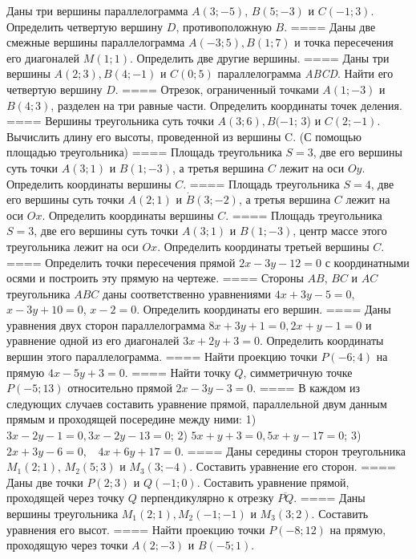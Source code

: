 Даны три вершины параллелограмма \(A(3; - 5)\), \(B(5; - 3)\) и \(C( - 1;3)\). Определить четвертую вершину \(D\), противоположную \(B\).
====
Даны две смежные вершины параллелограмма \(A( - 3;5),B(1;7)\) и точка пересечения его диагоналей \(M(1;1)\). Определить две другие вершины.
====
Даны три вершины \(A(2;3),B(4; - 1)\) и \(C(0;5)\) параллелограмма \emph{ABCD}. Найти его четвертую вершину \(D\).
====
Отрезок, ограниченный точками \(A(1; - 3)\) и \(B(4;3)\), разделен на три равные части. Определить координаты точек деления.
====
Вершины треугольника суть точки \(A(3;6),B( - 1\); 3) и \(C(2; - 1)\). Вычислить длину его высоты, проведенной из вершины C. (С помощью площадью треугольника)
====
Площадь треугольника \(S = 3\), две его вершины суть точки \(A(3;1)\) и \(B(1; - 3)\), а третья вершина \(C\) лежит на оси \(Oy\). Определить координаты вершины \(C\).
====
Площадь треугольника \(S = 4\), две его вершины суть точки \(A(2;1)\) и \(\dot{B}(3; - 2)\), а третья вершина \(C\) лежит на оси \(Ox\). Определить координаты вершины \(C\).
====
Площадь треугольника \(S = 3\), две его вершины суть точки \(A(3;1)\) и \(B(1; - 3)\), центр массе этого треугольника лежит на оси \(Ox\). Определить координаты третьей вершины \(C\).
====
Определить точки пересечения прямой \(2x - 3y - 12 = 0\) с координатными осями и построить эту прямую на чертеже.
====
Стороны \(AB\), \(BC\) и \(AC\) треугольника \(ABC\) даны соответственно уравнениями \(4x + 3y - 5 = 0\), \(x - 3y + 10 = 0\), \(x - 2 = 0\). Определить координаты его вершин.
====
Даны уравнения двух сторон параллелограмма \(8x + 3y + 1 = 0,2x + y - 1 = 0\) и уравнение одной из его диагоналей \(3x + 2y + 3 = 0\). Определить координаты вершин этого параллелограмма.
====
Найти проекцию точки \(P( - 6;4)\) на прямую \(4x - 5y + 3 = 0\).
====
Найти точку \(Q\), симметричную точке \(P( - 5;13)\) относительно прямой \(2x - 3y - 3 = 0.\)
====
В каждом из следующих случаев составить уравнение прямой, параллельной двум данным прямым и проходящей посередине между ними: 1)  \(3x - 2y - 1 = 0,3x - 2y - 13 = 0\); 2)  \(5x + y + 3 = 0,5x + y - 17 = 0\); 3)  \(2x + 3y - 6 = 0,\ \ \ \ 4x + 6y + 17 = 0\).
====
Даны середины сторон треугольника \(M_{1}(2;1)\), \(M_{2}(5;3)\) и \(M_{3}(3; - 4)\). Составить уравнение его сторон.
====
Даны две точки \(P(2;3)\) и \(Q( - 1;0)\). Составить уравнение прямой, проходящей через точку \(Q\) перпендикулярно к отрезку \(\overline{PQ}\).
====
Даны вершины треугольника \(M_{1}(2;1),M_{2}( - 1; - 1)\) и \(M_{3}(3;2)\). Составить уравнения его высот.
====
Найти проекцию точки \(P( - 8;12)\) на прямую, проходящую через точки \(A(2; - 3)\) и \(B( - 5;1)\).
